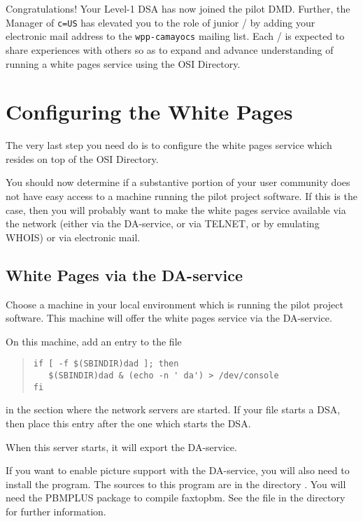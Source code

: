 Congratulations!
Your Level-1 DSA has now joined the pilot DMD.
Further,
the Manager of \verb"c=US" has elevated you to the role of
junior \camayoc/ by adding your electronic mail address to the 
\verb"wpp-camayocs" mailing list.
Each \camayoc/ is expected to share experiences with others so as to
expand and advance understanding of running a white pages service using the
OSI Directory.

\section	{Configuring the White Pages}
The very last step you need do is to configure the white pages service which
resides on top of the OSI Directory.

You should now determine if a substantive portion of your user community does
not have easy access to a machine running the pilot project software.
If this is the case,
then you will probably want to make the white pages service available via the
network (either via the DA-service, or via TELNET, or by emulating WHOIS)
or via electronic mail.

\subsection	{White Pages via the DA-service}
Choose a machine in your local environment which is running the pilot project
software.
This machine will offer the white pages service via the DA-service.

On this machine,
add an entry to the file 
\begin{quote}\smaller\begin{verbatim}
if [ -f $(SBINDIR)dad ]; then
   $(SBINDIR)dad & (echo -n ' da') > /dev/console
fi
\end{verbatim}\end{quote}
in the section where the network servers are started.
If your  file starts a DSA,
then place this entry after the one which starts the DSA.

When this server starts,
it will export the DA-service.

If you want to enable picture support with the DA-service,
you will also need to install the  program.
The sources to this program are in the directory .
You will need the PBMPLUS package to compile faxtopbm.
See the  file in the  directory for
further information.

